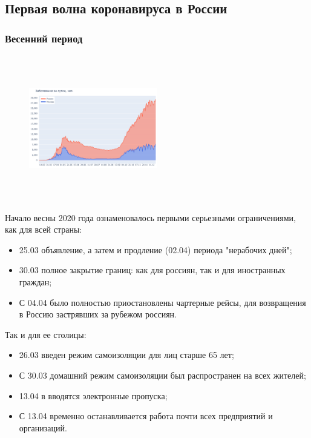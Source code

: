 \documentclass[a4paper, 12pt]{extarticle}
\begin{document}
\subsection{Первая волна коронавируса в России}
\subsubsection{Весенний период}

\begin{figure}
    \centering
    \vspace{-20pt}
    \includegraphics[height=180pt, width=0.50\textwidth]{../plots/1day_confirmed_russia_moscow.pdf}
    \label{fig:day_confirmed_russia_moscow}
\end{figure}

Начало весны 2020 года ознаменовалось первыми серьезными ограничениями, как для всей страны:

\begin{itemize}
    \item 25.03 объявление, а затем и продление (02.04) периода "нерабочих дней";
    \item 30.03 полное закрытие границ: как для россиян, так и для иностранных граждан;
    \item С 04.04 было полностью приостановлены чартерные рейсы, для возвращения в Россию застрявших за рубежом россиян.
\end{itemize}
\vspace{4mm}

Так и для ее столицы:

\begin{itemize}
    \item 26.03 введен режим самоизоляции для лиц старше 65 лет;
    \item С 30.03 домашний режим самоизоляции был распространен на всех жителей;
    \item 13.04 в вводятся электронные пропуска;
    \item С 13.04 временно останавливается работа почти всех предприятий и организаций.
\end{itemize}
\vspace{3mm}
\end{document}

